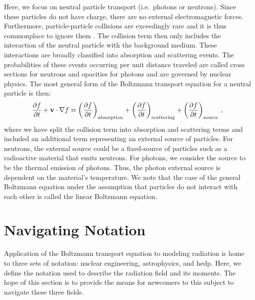 \documentclass[../doc.tex]{subfiles}
\begin{document}
Here, we focus on neutral particle transport (i.e.~photons or neutrons). Since these particles do not have charge, there are no external electromagnetic forces. Furthermore, particle-particle collisions are exceedingly rare and it is thus commonplace to ignore them \cite{neutron_transport_LM}. The collision term then only includes the interaction of the neutral particle with the background medium. These interactions are broadly classified into absorption and scattering events. The probabilities of these events occurring per unit distance traveled are called cross sections for neutrons and opacities for photons and are governed by nuclear physics. The most general form of the Boltzmann transport equation for a neutral particle is then: 
	\begin{equation} \label{trans:linboltz}
		\frac{\partial f}{\partial t} + \boldsymbol{\mathrm{v}} \cdot \nabla f = \left( \frac{\partial f}{\partial t} \right)_\text{absorption} + \left( \frac{\partial f}{\partial t} \right)_\text{scattering} + \left( \frac{\partial f}{\partial t} \right)_\text{source} \,,
	\end{equation}
where we have split the collision term into absorption and scattering terms and included an additional term representing an external source of particles. For neutrons, the external source could be a fixed-source of particles such as a radioactive material that emits neutrons. For photons, we consider the source to be the thermal emission of photons. Thus, the photon external source is dependent on the material's temperature. We note that the case of the general Boltzmann equation under the assumption that particles do not interact with each other is called the linear Boltzmann equation. 

\section{Navigating Notation}
Application of the Boltzmann transport equation to modeling radiation is home to three sets of notation: nuclear engineering, astrophysics, and \gls{hedp}. Here, we define the notation used to describe the radiation field and its moments. The hope of this section is to provide the means for newcomers to this subject to navigate these three fields. 
\end{document}
